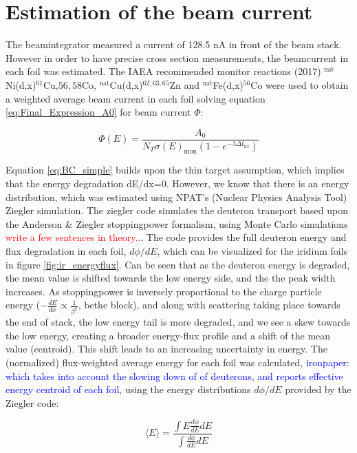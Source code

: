 \section{Estimation of the beam current}
The beamintegrator measured a current of 128.5 nA in front of the beam stack. However in order to have precise cross section measurements, the beamcurrent in each foil was estimated. The IAEA recommended monitor reactions (2017) $^\text{nat}$Ni(d,x)$^{61}$Cu,$56,58$Co, $^\text{nat}$Cu(d,x)$^{62,63,65}$Zn and $^\text{nat}$Fe(d,x)$^{56}$Co were used to obtain a weighted average beam current in each foil solving equation \ref{eq:Final_Expression_A0} for beam current $\Phi$:

\begin{equation} \label{eq:BC_simple}
    \Phi(E) = \frac{A_0}{N_T \sigma(E)_\text{mon}(1-e^{-\lambda \Delta t_\text{irr}})}
\end{equation}

Equation \ref{eq:BC_simple} builds upon the thin target assumption, which implies that the energy degradation dE/dx=0. However, we know that there is an energy distribution, which was estimated using NPAT's (Nuclear Physics Analysis Tool) Ziegler simulation. The ziegler code simulates the deuteron transport based upon the Anderson \& Ziegler stoppingpower formalism, using Monte Carlo simulations \textcolor{red}{write a few sentences in theory..}. The code provides the full deuteron energy and flux degradation in each foil, $d\phi/dE$, which can be visualized for the iridium foils in figure \ref{fig:ir_energyflux}.  Can be seen that as the deuteron energy is degraded, the mean value is shifted towards the low energy side, and the the peak width increases. As stoppingpower is inversely proportional to the charge particle energy ($-\frac{dE}{dx}\propto \frac{1}{\beta^2}$, bethe block), and along with scattering taking place towards the end of stack, the low energy tail is more degraded, and we see a skew towards the low energy, creating a broader energy-flux profile and a shift of the mean value (centroid). This shift leads to an increasing uncertainty in energy. The (normalized) flux-weighted average energy for each foil was calculated, \textcolor{blue}{ironpaper: which takes into account the slowing down of of deuterons, and reports effective energy centroid of each foil}, using the energy distributions $d\phi/dE$ provided by the Ziegler code:

\begin{equation} \label{eq:flux_weighted_average_energy}
    \langle E \rangle = \frac{\int E \frac{d\phi}{dE}dE}{\int \frac{d\phi}{dE}dE}
\end{equation}

